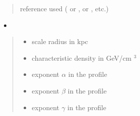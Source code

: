 \documentclass[letterpaper,10pt,english]{sphinxmanual}
\begin{document}
\begin{fulllineitems}
\begin{itemize}
\end{itemize}
\begin{quote}\begin{description}
\sphinxAtStartPar
{} \textendash{} reference used ( or \sphinxcode{\sphinxupquote{\textquotesingle{}1309.2641\textquotesingle{}}},  or \sphinxcode{\sphinxupquote{\textquotesingle{}1408.0002\textquotesingle{}}}, etc.)

\end{description}\end{quote}
\begin{itemize}
\item {} 
\sphinxAtStartPar
{}

\end{itemize}
\begin{quote}\begin{description}
\begin{itemize}
\item {} 
\sphinxAtStartPar
{} \textendash{} scale radius in kpc

\item {} 
\sphinxAtStartPar
{} \textendash{} characteristic density in GeV/cm \({}^3\)

\item {} 
\sphinxAtStartPar
{} \textendash{} exponent \(\alpha\) in the {\hyperref[\detokenize{diffsph.profiles:diffsph.profiles.templates.hdz}]{}} profile

\item {} 
\sphinxAtStartPar
{} \textendash{} exponent \(\beta\) in the {\hyperref[\detokenize{diffsph.profiles:diffsph.profiles.templates.hdz}]{}} profile

\item {} 
\sphinxAtStartPar
{} \textendash{} exponent \(\gamma\) in the {\hyperref[\detokenize{diffsph.profiles:diffsph.profiles.templates.hdz}]{}} profile


\end{itemize}
\end{description}
\end{quote}
\end{fulllineitems}
\end{document}
